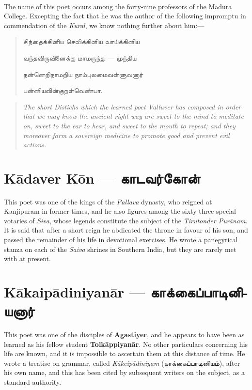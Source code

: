 \documentclass{article}
\newcommand{\TamilText}[1]{\texttamil{#1}}
\newcommand{\TamilBold}[1]{\texttamil{\textbf{#1}}}
\newcommand{\tam}[1]{\TamilText{#1}}
\newcommand{\tambold}[1]{\TamilBold{#1}}
\begin{document}
\paragraph{}
The name of this poet occurs among the forty-nine professors of the Madura College. Excepting the fact that he was the author of the following impromptu in commendation of the \emph{Kural}, we know nothing further about him:---
\begin{quotation}\small
\tam{சிந்தைக்கினிய செவிக்கினிய வாய்க்கினிய}

\tam{வந்தவிருவினைக்கு மாமருந்து} --- \tam{முந்திய}

\tam{நன்னெறிநாமறிய நாம்புலமைவள்ளுவனார்}

\tam{பன்னியவின்குறள்வெண்பா}.
\end{quotation}
\begin{quotation}\small
\emph{The short Distichs which the learned poet Valluver has composed in order that we may know the ancient right way are sweet to the mind to meditate on, sweet to the ear to hear, and sweet to the mouth to repeat; and they moreover form a sovereign medicine to promote good and prevent evil actions.}
\end{quotation}

\section{K\={a}daver K\={o}n --- \tambold{காடவர்கோன்}}
\paragraph{}
This poet was one of the kings of the \emph{Pallava} dynasty, who reigned at Kanjipuram in former times, and he also figures among the sixty-three special votaries of \emph{Siva}, whose legends constitute the subject of the \emph{Tirutonder Pur\={a}nam}. It is said that after a short reign he abdicated the throne in favour of his son, and passed the remainder of his life in devotional exercises. He wrote a panegyrical stanza on each of the \emph{Saiva} shrines in Southern India, but they are rarely met with at present.

\section{K\={a}kaip\={a}diniyan\={a}r --- \tambold{காக்கைப்பாடினியனார்}}
\paragraph{}
This poet was one of the disciples of \textbf{Agastiyer}, and he appears to have been as learned as his fellow student \textbf{Tolk\={a}ppiyan\={a}r}. No other particulars concerning his life are known, and it is impossible to ascertain them at this distance of time. He wrote a treatise on grammar, called \emph{K\={a}keip\={a}diniyam} (\tam{காக்கைப்பாடினியம்}), after his own name, and this has been cited by subsequent writers on the subject, as a standard authority.
\end{document}
